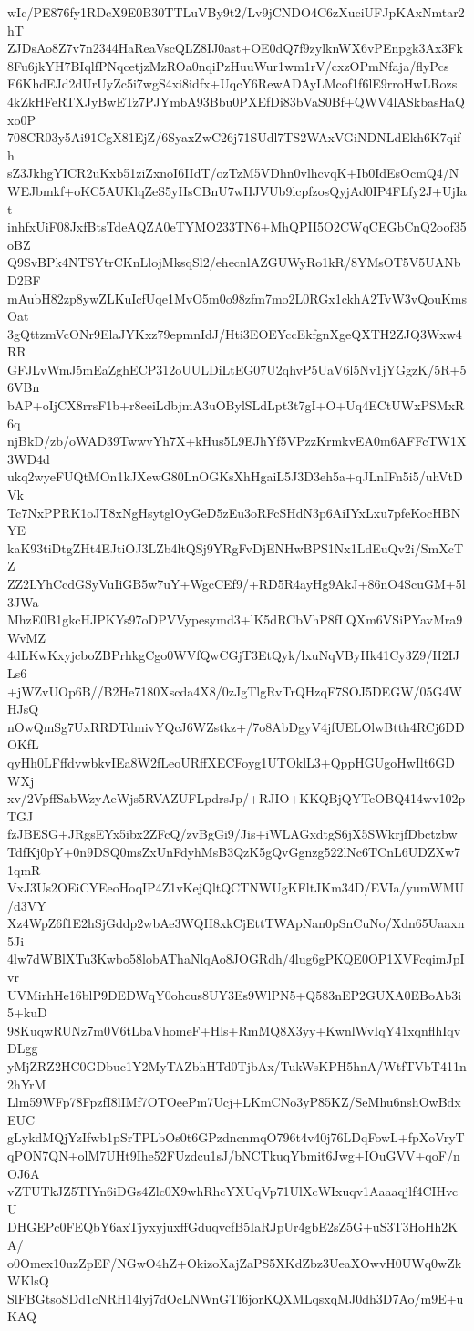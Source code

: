 wIc/PE876fy1RDcX9E0B30TTLuVBy9t2/Lv9jCNDO4C6zXuciUFJpKAxNmtar2hT
ZJDsAo8Z7v7n2344HaReaVscQLZ8IJ0ast+OE0dQ7f9zylknWX6vPEnpgk3Ax3Fk
8Fu6jkYH7BIqlfPNqcetjzMzROa0nqiPzHuuWur1wm1rV/cxzOPmNfaja/flyPcs
E6KhdEJd2dUrUyZc5i7wgS4xi8idfx+UqcY6RewADAyLMcof1f6lE9rroHwLRozs
4kZkHFeRTXJyBwETz7PJYmbA93Bbu0PXEfDi83bVaS0Bf+QWV4lASkbasHaQxo0P
708CR03y5Ai91CgX81EjZ/6SyaxZwC26j71SUdl7TS2WAxVGiNDNLdEkh6K7qifh
sZ3JkhgYICR2uKxb51ziZxnoI6IIdT/ozTzM5VDhn0vlhcvqK+Ib0IdEsOcmQ4/N
WEJbmkf+oKC5AUKlqZeS5yHsCBnU7wHJVUb9lcpfzosQyjAd0IP4FLfy2J+UjIat
inhfxUiF08JxfBtsTdeAQZA0eTYMO233TN6+MhQPII5O2CWqCEGbCnQ2oof35oBZ
Q9SvBPk4NTSYtrCKnLlojMksqSl2/ehecnlAZGUWyRo1kR/8YMsOT5V5UANbD2BF
mAubH82zp8ywZLKuIcfUqe1MvO5m0o98zfm7mo2L0RGx1ckhA2TvW3vQouKmsOat
3gQttzmVcONr9ElaJYKxz79epmnIdJ/Hti3EOEYccEkfgnXgeQXTH2ZJQ3Wxw4RR
GFJLvWmJ5mEaZghECP312oUULDiLtEG07U2qhvP5UaV6l5Nv1jYGgzK/5R+56VBn
bAP+oIjCX8rrsF1b+r8eeiLdbjmA3uOBylSLdLpt3t7gI+O+Uq4ECtUWxPSMxR6q
njBkD/zb/oWAD39TwwvYh7X+kHus5L9EJhYf5VPzzKrmkvEA0m6AFFcTW1X3WD4d
ukq2wyeFUQtMOn1kJXewG80LnOGKsXhHgaiL5J3D3eh5a+qJLnIFn5i5/uhVtDVk
Tc7NxPPRK1oJT8xNgHsytglOyGeD5zEu3oRFcSHdN3p6AiIYxLxu7pfeKocHBNYE
kaK93tiDtgZHt4EJtiOJ3LZb4ltQSj9YRgFvDjENHwBPS1Nx1LdEuQv2i/SmXcTZ
ZZ2LYhCcdGSyVuIiGB5w7uY+WgcCEf9/+RD5R4ayHg9AkJ+86nO4ScuGM+5l3JWa
MhzE0B1gkcHJPKYs97oDPVVypesymd3+lK5dRCbVhP8fLQXm6VSiPYavMra9WvMZ
4dLKwKxyjcboZBPrhkgCgo0WVfQwCGjT3EtQyk/lxuNqVByHk41Cy3Z9/H2IJLs6
+jWZvUOp6B//B2He7180Xscda4X8/0zJgTlgRvTrQHzqF7SOJ5DEGW/05G4WHJsQ
nOwQmSg7UxRRDTdmivYQcJ6WZstkz+/7o8AbDgyV4jfUELOlwBtth4RCj6DDOKfL
qyHh0LFffdvwbkvIEa8W2fLeoURffXECFoyg1UTOklL3+QppHGUgoHwIlt6GDWXj
xv/2VpffSabWzyAeWjs5RVAZUFLpdrsJp/+RJIO+KKQBjQYTeOBQ414wv102pTGJ
fzJBESG+JRgsEYx5ibx2ZFcQ/zvBgGi9/Jis+iWLAGxdtgS6jX5SWkrjfDbctzbw
TdfKj0pY+0n9DSQ0msZxUnFdyhMsB3QzK5gQvGgnzg522lNc6TCnL6UDZXw71qmR
VxJ3Us2OEiCYEeoHoqIP4Z1vKejQltQCTNWUgKFltJKm34D/EVIa/yumWMU/d3VY
Xz4WpZ6f1E2hSjGddp2wbAe3WQH8xkCjEttTWApNan0pSnCuNo/Xdn65Uaaxn5Ji
4lw7dWBlXTu3Kwbo58lobAThaNlqAo8JOGRdh/4lug6gPKQE0OP1XVFcqimJpIvr
UVMirhHe16blP9DEDWqY0ohcus8UY3Es9WlPN5+Q583nEP2GUXA0EBoAb3i5+kuD
98KuqwRUNz7m0V6tLbaVhomeF+Hls+RmMQ8X3yy+KwnlWvIqY41xqnflhIqvDLgg
yMjZRZ2HC0GDbuc1Y2MyTAZbhHTd0TjbAx/TukWsKPH5hnA/WtfTVbT411n2hYrM
Llm59WFp78FpzfI8lIMf7OTOeePm7Ucj+LKmCNo3yP85KZ/SeMhu6nshOwBdxEUC
gLykdMQjYzIfwb1pSrTPLbOs0t6GPzdncnmqO796t4v40j76LDqFowL+fpXoVryT
qPON7QN+olM7UHt9Ihe52FUzdcu1sJ/bNCTkuqYbmit6Jwg+IOuGVV+qoF/nOJ6A
vZTUTkJZ5TIYn6iDGs4Zlc0X9whRhcYXUqVp71UlXcWIxuqv1Aaaaqjlf4CIHvcU
DHGEPc0FEQbY6axTjyxyjuxffGduqvcfB5IaRJpUr4gbE2sZ5G+uS3T3HoHh2KA/
o0Omex10uzZpEF/NGwO4hZ+OkizoXajZaPS5XKdZbz3UeaXOwvH0UWq0wZkWKlsQ
SlFBGtsoSDd1cNRH14lyj7dOcLNWnGTl6jorKQXMLqsxqMJ0dh3D7Ao/m9E+uKAQ
